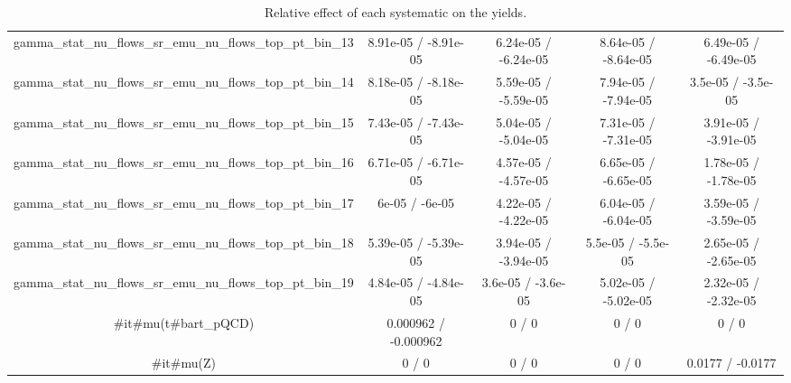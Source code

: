 \documentclass[10pt]{article}
\begin{document}
\begin{table}[htbp]
\begin{center}
\begin{tabular}{|c|c|c|c|c|}
  gamma_stat_nu_flows_sr_emu_nu_flows_top_pt_bin_13 & 8.91e-05 / -8.91e-05 & 6.24e-05 / -6.24e-05 & 8.64e-05 / -8.64e-05 & 6.49e-05 / -6.49e-05 \\ 
  gamma_stat_nu_flows_sr_emu_nu_flows_top_pt_bin_14 & 8.18e-05 / -8.18e-05 & 5.59e-05 / -5.59e-05 & 7.94e-05 / -7.94e-05 & 3.5e-05 / -3.5e-05 \\ 
  gamma_stat_nu_flows_sr_emu_nu_flows_top_pt_bin_15 & 7.43e-05 / -7.43e-05 & 5.04e-05 / -5.04e-05 & 7.31e-05 / -7.31e-05 & 3.91e-05 / -3.91e-05 \\ 
  gamma_stat_nu_flows_sr_emu_nu_flows_top_pt_bin_16 & 6.71e-05 / -6.71e-05 & 4.57e-05 / -4.57e-05 & 6.65e-05 / -6.65e-05 & 1.78e-05 / -1.78e-05 \\ 
  gamma_stat_nu_flows_sr_emu_nu_flows_top_pt_bin_17 & 6e-05 / -6e-05 & 4.22e-05 / -4.22e-05 & 6.04e-05 / -6.04e-05 & 3.59e-05 / -3.59e-05 \\ 
  gamma_stat_nu_flows_sr_emu_nu_flows_top_pt_bin_18 & 5.39e-05 / -5.39e-05 & 3.94e-05 / -3.94e-05 & 5.5e-05 / -5.5e-05 & 2.65e-05 / -2.65e-05 \\ 
  gamma_stat_nu_flows_sr_emu_nu_flows_top_pt_bin_19 & 4.84e-05 / -4.84e-05 & 3.6e-05 / -3.6e-05 & 5.02e-05 / -5.02e-05 & 2.32e-05 / -2.32e-05 \\ 
  #it{#mu}(t#bar{t}_{pQCD}) & 0.000962 / -0.000962 & 0 / 0 & 0 / 0 & 0 / 0 \\ 
  #it{#mu}(Z) & 0 / 0 & 0 / 0 & 0 / 0 & 0.0177 / -0.0177 \\ 
\hline 
\end{tabular} 
\caption{Relative effect of each systematic on the yields.} 
\end{center} 
\end{table} 
\end{document}
